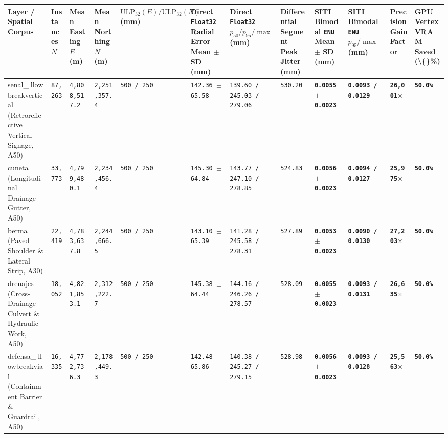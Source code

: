 \documentclass[10pt,a4paper]{article}
\begin{document}
{\scriptsize
\begin{longtable}{p{}p{}p{}p{}p{}p{}p{}p{}p{}p{}p{}p{}}
\toprule
\textbf{Layer / Spatial Corpus} & \textbf{Instances $N$} & \textbf{Mean Easting $E$ (m)} & \textbf{Mean Northing $N$ (m)} & \textbf{$\text{ULP}_{32}(E) / \text{ULP}_{32}(N)$ (mm)} & \textbf{Direct \texttt{Float32} Radial Error Mean $\pm$ SD (mm)} & \textbf{Direct \texttt{Float32} $p_{50} / p_{95} / \max$ (mm)} & \textbf{Differential Segment Peak Jitter (mm)} & \textbf{SITI Bimodal \texttt{ENU} Mean $\pm$ SD (mm)} & \textbf{SITI Bimodal \texttt{ENU} $p_{95} / \max$ (mm)} & \textbf{Precision Gain Factor} & \textbf{GPU Vertex VRAM Saved (\textbackslash\{\}\%)} \\
\midrule
\endhead
senal\_llowbreak{}vertical (Retroreflective Vertical Signage, A50) & \texttt{87,263} & \texttt{4,808,517.2} & \texttt{2,251,357.4} & \texttt{500 / 250} & \texttt{142.36 $\pm$ 65.58} & \texttt{139.60 / 245.03 / 279.06} & \texttt{530.20} & \textbf{\texttt{0.0055 $\pm$ 0.0023}} & \textbf{\texttt{0.0093 / 0.0129}} & \textbf{\texttt{26,001$\times$}} & \textbf{\texttt{50.0\%}} \\
cuneta (Longitudinal Drainage Gutter, A50) & \texttt{33,773} & \texttt{4,799,480.1} & \texttt{2,234,456.4} & \texttt{500 / 250} & \texttt{145.30 $\pm$ 64.84} & \texttt{143.77 / 247.10 / 278.85} & \texttt{524.83} & \textbf{\texttt{0.0056 $\pm$ 0.0023}} & \textbf{\texttt{0.0094 / 0.0127}} & \textbf{\texttt{25,975$\times$}} & \textbf{\texttt{50.0\%}} \\
berma (Paved Shoulder \& Lateral Strip, A30) & \texttt{22,419} & \texttt{4,783,637.8} & \texttt{2,244,666.5} & \texttt{500 / 250} & \texttt{143.10 $\pm$ 65.39} & \texttt{141.28 / 245.58 / 278.31} & \texttt{527.89} & \textbf{\texttt{0.0053 $\pm$ 0.0023}} & \textbf{\texttt{0.0090 / 0.0130}} & \textbf{\texttt{27,203$\times$}} & \textbf{\texttt{50.0\%}} \\
drenajes (Cross-Drainage Culvert \& Hydraulic Work, A50) & \texttt{18,052} & \texttt{4,821,853.1} & \texttt{2,312,222.7} & \texttt{500 / 250} & \texttt{145.38 $\pm$ 64.44} & \texttt{144.16 / 246.26 / 278.57} & \texttt{528.09} & \textbf{\texttt{0.0055 $\pm$ 0.0023}} & \textbf{\texttt{0.0093 / 0.0131}} & \textbf{\texttt{26,635$\times$}} & \textbf{\texttt{50.0\%}} \\
defensa\_llowbreak{}vial (Containment Barrier \& Guardrail, A50) & \texttt{16,335} & \texttt{4,772,736.3} & \texttt{2,178,449.3} & \texttt{500 / 250} & \texttt{142.48 $\pm$ 65.86} & \texttt{140.38 / 245.27 / 279.15} & \texttt{528.98} & \textbf{\texttt{0.0056 $\pm$ 0.0023}} & \textbf{\texttt{0.0093 / 0.0128}} & \textbf{\texttt{25,563$\times$}} & \textbf{\texttt{50.0\%}} \\

\end{longtable}}
\end{document}
